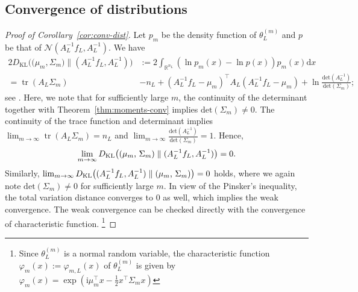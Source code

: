 \documentclass[11pt,english]{article}
\theoremstyle{plain}
\theoremstyle{plain}
\theoremstyle{plain}
\theoremstyle{plain}
\numberwithin{equation}{section}
\begin{document}
\subsection{Convergence of distributions}\label{sec:proof_distribution_convergence}
\begin{proof}[Proof of Corollary~\ref{cor:conv-dist}]
	Let $p_{m}$ be the density function of $\theta_{L}^{(m)}$ and $p$
	be that of $\mathcal{N}(A_{L}^{-1}f_{L},A_{L}^{-1})$. We
	have
	\begin{align*}
		2{\displaystyle D_{\text{KL}}\bigl(({\mu_{m}},\ensuremath{\Sigma_{m}}})\parallel(A_{L}^{-1}f_{L},A_{L}^{-1})\bigr) & :=2\int_{\mathbb{R}^{n_{L}}}(\ln p_{m}(x)-\ln p(x))p_{m}(x)\mathrm{d}x                                                                                                                     \\
		=\operatorname{tr}\left(A_{L}\Sigma_{m}\right)                                                                              & -n_{L}+\left(A_{L}^{-1}f_{L}-\ensuremath{\mu_{m}}\right)^{\top}A_{L}(A_{L}^{-1}f_{L}-\ensuremath{\mu_{m}})+\ln\frac{\mathrm{det}(A_{L}^{-1})}{\mathrm{det}(\Sigma_{m})};
	\end{align*}
	see \cite[(6.32)]{murphy2022probabilistic}. Here, we note that for
	sufficiently large $m$, the continuity of the determinant together
	with Theorem~\ref{thm:moments-conv} implies $\mathrm{det}(\Sigma_{m})\neq0$.
	The continuity of the trace function and determinant implies $\lim_{m\to\infty}\operatorname{tr}(A_{L}\Sigma_{m})=n_{L}$
	and $\lim_{m\to\infty}\frac{\mathrm{det}(A_{L}^{-1})}{\mathrm{det}(\Sigma_{m})}=1$.
	Hence,
	\[
		\lim_{m\to\infty}{\displaystyle D_{\text{KL}}\bigl((\text{\ensuremath{\mu_{m}}, \ensuremath{\Sigma_{m}}})\parallel(A_{L}^{-1}f_{L},A_{L}^{-1})\bigr)=0.}
	\]
	Similarly, $\lim_{m\to\infty}{ D_{\text{KL}}\bigl((A_{L}^{-1}f_{L},A_{L}^{-1})\parallel(\text{\ensuremath{\mu_{m}}, \ensuremath{\Sigma_{m}}})\bigr)=0}$
	holds, where we again note $\mathrm{det}(\Sigma_{m})\neq0$ for sufficiently
	large $m$. In view of the Pinsker's inequality, the total variation
	distance converges to $0$ as well, which implies the weak convergence.
	The weak convergence can be checked directly with the convergence
	of characteristic function.
	\iffalse
	\footnote{Since $\theta_{L}^{(m)}$ is a normal random variable, the characteristic
		function $\varphi_{m}(x):=\varphi_{m,L}(x)$ of $\theta_{L}^{(m)}$
		is given by $\varphi_{m}(x)=\exp(\mathrm{i}\mu_{m}^{\top}x-\frac{1}{2}x^{\top}\Sigma_{m}x)$
}
\end{proof}
\end{document}
